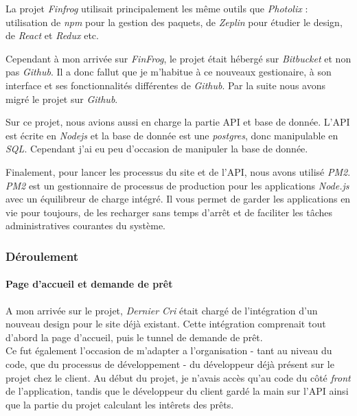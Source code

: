 \bigskip

La projet \emph{Finfrog} utilisait principalement les même outils que
\emph{Photolix} : utilisation de \emph{npm} pour la gestion des paquets,
de \emph{Zeplin} pour étudier le design, de \emph{React} et \emph{Redux}
etc.

\bigskip

Cependant à mon arrivée sur \emph{FinFrog}, le projet était hébergé sur
\emph{Bitbucket} et non pas \emph{Github}. Il a donc fallut que je
m'habitue à ce nouveaux gestionaire, à son interface et ses
fonctionnalités différentes de \emph{Github}. Par la suite nous avons
migré le projet sur \emph{Github}.

\bigskip

Sur ce projet, nous avions aussi en charge la partie API et base de
donnée. L'API est écrite en \emph{Nodejs} et la base de donnée est une
\emph{postgres}, donc manipulable en \emph{SQL}. Cependant j'ai eu peu
d'occasion de manipuler la base de donnée.

\bigskip

Finalement, pour lancer les processus du site et de l'API, nous avons
utilisé \emph{PM2}. \emph{PM2} est un gestionnaire de processus de
production pour les applications \emph{Node.js} avec un équilibreur de
charge intégré. Il vous permet de garder les applications en vie pour
toujours, de les recharger sans temps d'arrêt et de faciliter les tâches
administratives courantes du système.

\bigskip

\subsubsection{Déroulement}\label{duxe9roulement-1}

\paragraph{Page d'accueil et demande de
prêt}\label{page-daccueil-et-demande-de-pruxeat}

\bigskip

A mon arrivée sur le projet, \emph{Dernier Cri} était chargé de
l'intégration d'un nouveau design pour le site déjà existant. Cette
intégration comprenait tout d'abord la page d'accueil, puis le tunnel de
demande de prêt.\\
Ce fut également l'occasion de m'adapter a l'organisation - tant au
niveau du code, que du processus de développement - du développeur déjà
présent sur le projet chez le client. Au début du projet, je n'avais
accès qu'au code du côté \emph{front} de l'application, tandis que le
développeur du client gardé la main sur l'API ainsi que la partie du
projet calculant les intêrets des prêts.

